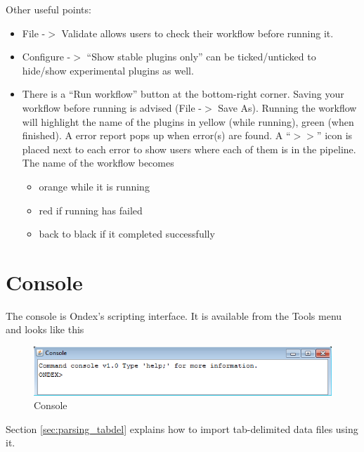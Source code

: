 Other useful points:
\begin{itemize}
\item File -$>$ Validate allows users to check their workflow before running it.
\item Configure -$>$ ``Show stable plugins only'' can be ticked/unticked to hide/show experimental plugins as well.
\item There is a ``Run workflow'' button at the bottom-right corner. Saving your workflow before running is advised (File -$>$ Save As).
Running the workflow will highlight the name of the plugins in yellow (while running), green (when finished).
A error report pops up when error(s) are found. A ``$>>$'' icon is placed next to each error to show users where each of them is in the pipeline.
The name of the workflow becomes
\begin{itemize}
\item orange while it is running
\item red if running has failed 
\item back to black if it completed successfully
\end{itemize}
\end{itemize}



\section{Console}
\label{sec:ref_console}
The console is Ondex's scripting interface. It is available from the Tools menu and looks like this
\begin{figure}[H]
\centering
\includegraphics[scale=0.7]{images/Oct12/console.png} 
\caption{Console}
\label{fig:console}
\end{figure}
Section \ref{sec:parsing_tabdel} explains how to import tab-delimited data files using it.

